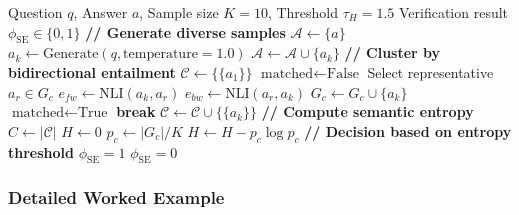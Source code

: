 \documentclass[12pt,a4paper]{article}
\theoremstyle{definition}
\begin{document}
\begin{algorithm}[htbp]
\caption{Semantic Entropy Verification (Layer 3)}
\begin{algorithmic}[1]
\Require Question $q$, Answer $a$, Sample size $K=10$, Threshold $\tau_H=1.5$
\Ensure Verification result $\phi_{\text{SE}} \in \{0, 1\}$
\State
\State \textbf{// Generate diverse samples}
\State $\mathcal{A} \gets \{a\}$ 
    \State $a_k \gets \text{Generate}(q, \text{temperature}=1.0)$ 
    \State $\mathcal{A} \gets \mathcal{A} \cup \{a_k\}$
\EndFor
\State
\State \textbf{// Cluster by bidirectional entailment}
\State $\mathcal{C} \gets \{\{a_1\}\}$ 
    \State $\text{matched} \gets \text{False}$
        \State Select representative $a_r \in G_c$
        \State $e_{fw} \gets \text{NLI}(a_k, a_r)$ 
        \State $e_{bw} \gets \text{NLI}(a_r, a_k)$ 
            \State $G_c \gets G_c \cup \{a_k\}$
            \State $\text{matched} \gets \text{True}$
            \State \textbf{break}
        \EndIf
    \EndFor
        \State $\mathcal{C} \gets \mathcal{C} \cup \{\{a_k\}\}$ 
    \EndIf
\EndFor
\State
\State \textbf{// Compute semantic entropy}
\State $C \gets |\mathcal{C}|$ 
\State $H \gets 0$
    \State $p_c \gets |G_c| / K$
    \State $H \gets H - p_c \log p_c$
\EndFor
\State
\State \textbf{// Decision based on entropy threshold}
 
    \State \Return $\phi_{\text{SE}} = 1$ 
\Else
    \State \Return $\phi_{\text{SE}} = 0$ 
\EndIf
\end{algorithmic}
\end{algorithm}

\subsubsection{Detailed Worked Example}
\end{document}
